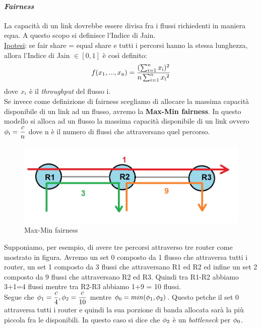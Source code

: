 \documentclass{article}
\begin{document}
\paragraph{\textit{Fairness}} La capacità di un link dovrebbe essere divisa fra i flussi richiedenti in maniera equa. A questo scopo si definisce l'Indice di Jain.\\
\underline{Ipotesi}: se fair share = equal share e tutti i percorsi hanno la stessa lunghezza, allora l'Indice di Jain \( \in [0, 1]\) è così definito:\\
\[ f(x\textsubscript{1},...,x\textsubscript{n}) = \frac{(\sum_{i=1}^n x\textsubscript{i})\textsuperscript{2}}{n\sum_{i=1}^n x\textsubscript{i}\textsuperscript{2}}
\]
dove \(\displaystyle x\textsubscript{i} \) è il \textit{throughput} del flusso i.\\
Se invece come definizione di fairness scegliamo di allocare la massima capacità disponibile di un link ad un flusso, avremo la \textbf{Max-Min fairness}. In questo modello si alloca ad un flusso la massima capacità disponibile di un link ovvero \( \displaystyle \phi\textsubscript{i} = \frac{c}{n} \) dove n è il numero di flussi che attraversano quel percorso.
\begin{figure}[H]
    \centering
    \includegraphics[scale=0.4]{figures/maxmin.jpg}
    \caption{Max-Min fairness}
\end{figure}
Supponiamo, per esempio, di avere tre percorsi attraverso tre router come mostrato in figura. Avremo un set 0 composto da 1 flusso che attraversa tutti i router, un set 1 composto da 3 flussi che attraversano R1 ed R2 ed infine un set 2 composto da 9 flussi che attraversano R2 ed R3. Quindi tra R1-R2 abbiamo 3+1=4 flussi mentre tra R2-R3 abbiamo 1+9 = 10 flussi.\\
Segue che \(\displaystyle \phi\textsubscript{1} = \frac{c}{4}, \phi\textsubscript{2} = \frac{c}{10}\) mentre \(\displaystyle \phi\textsubscript{0} = min(\phi\textsubscript{1}, \phi\textsubscript{2})\). Questo petche il set 0 attraversa tutti i router e quindi la sua porzione di banda allocata sarà la più piccola fra le disponibili. In questo caso si dice che \(\displaystyle \phi\textsubscript{2} \) è un \textit{bottleneck} per \(\displaystyle \phi\textsubscript{0} \).\\
\end{document}
